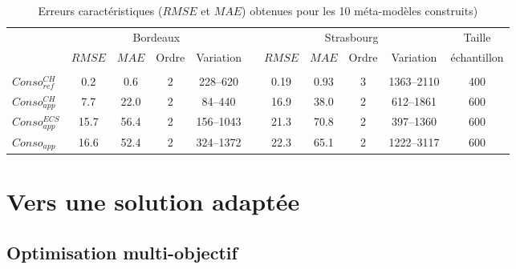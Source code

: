 \begin{table}
\centering
\caption{Erreurs caractéristiques ($RMSE$ et $MAE$) obtenues pour les \num{10} méta-modèles
         construits)
\label{tab:meta_result_bilan}}
\begin{tabular}{l c c c c c c c c c c}
    \toprule
                    & \multicolumn{4}{c}{Bordeaux} & & \multicolumn{4}{c}{Strasbourg} &
                      Taille \\
                    \cmidrule(r){2-5}
                    \cmidrule(r){7-10}
                    & $RMSE$ & $MAE$  & Ordre & Variation  &       & $RMSE$ & $MAE$ & Ordre & Variation & échantillon \\                        \\
    \midrule
    $Conso_{ref}^{CH}$  & 0.2  & 0.6  & 2 & \numrange{228}{620}&   & 0.19   & 0.93  & 3     & \numrange{1363}{2110} & \num{400}  \\
    \addlinespace[\defaultaddspace]
    $Conso_{app}^{CH}$  & 7.7  & 22.0 & 2 & \numrange{84}{440} &   & 16.9   & 38.0  & 2     & \numrange{612}{1861}       & \num{600} \\
    \addlinespace[\defaultaddspace]
    $Conso_{app}^{ECS}$ & 15.7 & 56.4 & 2 & \numrange{156}{1043}&  & 21.3   & 70.8  & 2     & \numrange{397}{1360}       & \num{600} \\
    \addlinespace[\defaultaddspace]
    $Conso_{app}$       & 16.6 & 52.4 & 2 & \numrange{324}{1372}&  & 22.3   & 65.1  & 2     & \numrange{1222}{3117}       & \num{600} \\
    \bottomrule
\end{tabular}
\end{table}






\section{Vers une solution adaptée} %
\label{sec:vers_une_solution_adaptee}
\subsection{Optimisation multi-objectif} %
\label{sub:optimisation_multi_objectif}
~

